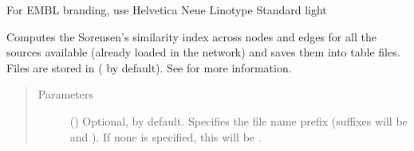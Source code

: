 \documentclass[letterpaper,10pt,english]{sphinxmanual}
\begin{document}
\begin{fulllineitems}
\begin{fulllineitems}
\begin{quote}
\begin{description}
\end{description}\end{quote}

\end{fulllineitems}


\begin{fulllineitems}
\label{\detokenize{main:pypath.main.PyPath.source_diagram}}
\end{fulllineitems}


\begin{fulllineitems}
\label{\detokenize{main:pypath.main.PyPath.source_network}}
For EMBL branding, use Helvetica Neue Linotype Standard light

\end{fulllineitems}


\begin{fulllineitems}
\label{\detokenize{main:pypath.main.PyPath.source_similarity}}
Computes the Sorensen’s similarity index across nodes and edges
for all the sources available (already loaded in the network)
and saves them into table files. Files are stored in
 ( by default).
See {\hyperref[\detokenize{main:pypath.main.PyPath.databases_similarity}]{}} for more
information.
\begin{quote}\begin{description}
\item[{Parameters}] \leavevmode
{} () \textendash{} Optional,  by default. Specifies the file name
prefix (suffixes will be  and ). If
none is specified, this will be
.


\end{description}
\end{quote}
\end{fulllineitems}
\end{fulllineitems}
\end{document}
